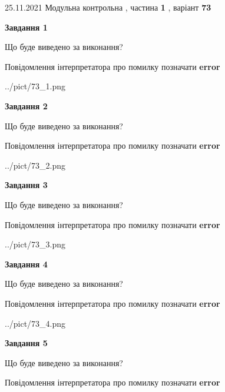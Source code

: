 \documentclass[10pt, ukrainian]{article}
\begin{document}
{25.11.2021 Модульна контрольна , частина \textbf { 1 }, варіант  \No \textbf { 73 }\par}
{
\begin {large}

{\begin {center}\textbf{Завдання 1}\end {center}}\par
Що буде виведено за виконання? \par
Повідомлення інтерпретатора про помилку позначати \textbf{error}

\begin{center}
	{../pict/73_1.png}
\end{center}
\newpage

{\begin {center}\textbf{Завдання 2}\end {center}}\par
Що буде виведено за виконання? \par
Повідомлення інтерпретатора про помилку позначати \textbf{error}

\begin{center}
	{../pict/73_2.png}
\end{center}
\newpage

{\begin {center}\textbf{Завдання 3}\end {center}}\par
Що буде виведено за виконання? \par
Повідомлення інтерпретатора про помилку позначати \textbf{error}

\begin{center}
	{../pict/73_3.png}
\end{center}
\newpage

{\begin {center}\textbf{Завдання 4}\end {center}}\par
Що буде виведено за виконання? \par
Повідомлення інтерпретатора про помилку позначати \textbf{error}

\begin{center}
	{../pict/73_4.png}
\end{center}
\newpage

{\begin {center}\textbf{Завдання 5}\end {center}}\par
Що буде виведено за виконання? \par
Повідомлення інтерпретатора про помилку позначати \textbf{error}


\end{large}}
\end{document}
